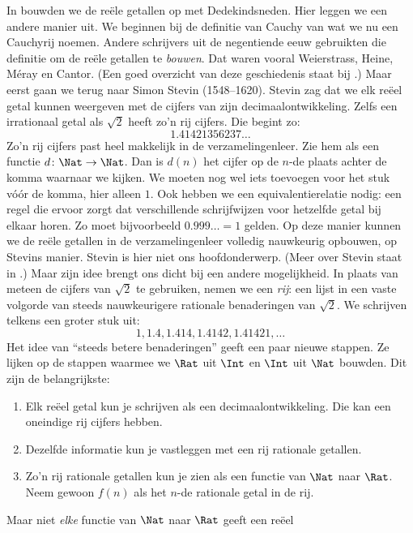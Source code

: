 \documentclass[openany]{memoir}
\begin{document}
In  bouwden we de reële getallen op met
Dedekindsneden. Hier leggen we een andere manier uit. We beginnen bij
de definitie van Cauchy van wat we nu een Cauchyrij noemen. Andere
schrijvers uit de negentiende eeuw gebruikten die definitie om de reële
getallen te \emph{bouwen}. Dat waren vooral Weierstrass, Heine,
M\'{e}ray en Cantor. (Een goed overzicht van deze geschiedenis staat
bij \citeauthor{OConnorRobertson:RN}
\citeyear{OConnorRobertson:RN}.)
Maar eerst gaan we terug naar Simon Stevin (1548--1620). Stevin zag dat
we elk reëel getal kunnen weergeven met de cijfers van zijn
decimaalontwikkeling. Zelfs een irrationaal getal als $\sqrt{2}$ heeft
zo'n rij cijfers. Die begint zo:
\[
	1.41421356237\ldots
\] 
Zo'n rij cijfers past heel makkelijk in de verzamelingenleer. Zie hem
als een functie $d \colon \Nat \to \Nat$. Dan is $d(n)$ het cijfer op
de $n$-de plaats achter de komma waarnaar we kijken. We moeten nog wel
iets toevoegen voor het stuk vóór de komma, hier alleen $1$. Ook
hebben we een equivalentierelatie nodig: een regel die ervoor zorgt dat
verschillende schrijfwijzen voor hetzelfde getal bij elkaar horen. Zo
moet bijvoorbeeld $0.999\ldots = 1$ gelden. Op deze manier kunnen we de
reële getallen in de verzamelingenleer volledig nauwkeurig opbouwen,
op Stevins manier.
Stevin is hier niet ons hoofdonderwerp. (Meer over Stevin staat in
\citealt{KatzKatz2012}.) Maar zijn idee brengt ons dicht bij een andere
mogelijkheid. In plaats van meteen de cijfers van $\sqrt{2}$ te
gebruiken, nemen we een \emph{rij}: een lijst in een vaste volgorde van
steeds nauwkeurigere rationale benaderingen van $\sqrt{2}$. We schrijven
telkens een groter stuk uit:
\[
1, 1.4, 1.414, 1.4142, 1.41421,\ldots
\]
Het idee van ``steeds betere benaderingen'' geeft een paar nieuwe
stappen. Ze lijken op de stappen waarmee we $\Rat$ uit $\Int$ en
$\Int$ uit $\Nat$ bouwden. Dit zijn de belangrijkste:
\begin{enumerate}
	\item Elk reëel getal kun je schrijven als een decimaalontwikkeling.
	Die kan een oneindige rij cijfers hebben.
	\item Dezelfde informatie kun je vastleggen met een rij rationale
	getallen.
	\item Zo'n rij rationale getallen kun je zien als een functie van
	$\Nat$ naar $\Rat$. Neem gewoon $f(n)$ als het $n$-de rationale getal
	in de rij.
\end{enumerate}
Maar niet \emph{elke} functie van $\Nat$ naar $\Rat$ geeft een reëel
\end{document}
